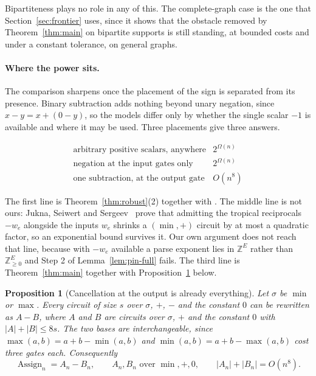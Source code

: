 \documentclass[11pt]{article}
\newtheorem{proposition}[theorem]{Proposition}
\newcommand{\Assign}{\operatorname{Assign}}
\begin{document}
Bipartiteness plays no role in any of this.  The complete-graph case is the one
that Section~\ref{sec:frontier} uses, since it shows that the obstacle removed
by Theorem~\ref{thm:main} on bipartite supports is still standing, at bounded
costs and under a constant tolerance, on general graphs.

\paragraph{Where the power sits.}
The comparison sharpens once the placement of the sign is separated from its
presence.  Binary subtraction adds nothing beyond unary negation, since
$x-y=x+(0-y)$, so the models differ only by whether the single scalar $-1$ is
available and where it may be used.  Three placements give three answers.

\begin{equation}
  \begin{array}{ll}
    \text{arbitrary positive scalars, anywhere} & 2^{\Omega(n)}\\[2pt]
    \text{negation at the input gates only} & 2^{\Omega(n)}\\[2pt]
    \text{one subtraction, at the output gate} & O(n^{8})
  \end{array}
  \label{eq:three-levels}
\end{equation}

The first line is Theorem~\ref{thm:robust}(2) together with
\cite{hertrich-stargalla26}.  The middle line is not ours: Jukna, Seiwert and
Sergeev~\cite{jukna-seiwert-sergeev20} prove that admitting the tropical
reciprocals $-w_e$ alongside the inputs $w_e$ shrinks a $(\min,+)$ circuit by at
most a quadratic factor, so an exponential bound survives it.  Our own argument
does not reach that line, because with $-w_e$ available a parse exponent lies in
$\mathbb Z^{E}$ rather than $\mathbb Z^{E}_{\ge0}$ and Step 2 of
Lemma~\ref{lem:pin-full} fails.  The third line is Theorem~\ref{thm:main}
together with Proposition~\ref{prop:normal-form} below.

\begin{proposition}[Cancellation at the output is already everything]
\label{prop:normal-form}
Let $\sigma$ be $\min$ or $\max$.  Every circuit of size $s$ over $\sigma$, $+$,
$-$ and the constant $0$ can be rewritten as $A-B$, where $A$ and $B$ are
circuits over $\sigma$, $+$ and the constant $0$ with $|A|+|B|\le8s$.
The two bases are interchangeable, since
$\max(a,b)=a+b-\min(a,b)$ and $\min(a,b)=a+b-\max(a,b)$ cost three gates each.
Consequently
\begin{equation}
  \Assign_n=A_n-B_n,
  \qquad
  A_n,B_n \text{ over } \min,+,0,
  \qquad
  |A_n|+|B_n|=O(n^{8}).
  \label{eq:normal-form}
\end{equation}
\end{proposition}
\end{document}
